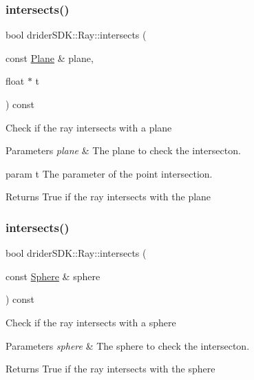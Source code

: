 \subsubsection{\texorpdfstring{intersects()}{intersects()}\hspace{0.1cm}{\footnotesize\ttfamily [3/6]}}
{\footnotesize\ttfamily bool drider\+S\+D\+K\+::\+Ray\+::intersects (\begin{DoxyParamCaption}\item[{const \hyperlink{classdrider_s_d_k_1_1_plane}{Plane} \&}]{plane,  }\item[{float $\ast$}]{t }\end{DoxyParamCaption}) const}

Check if the ray intersects with a plane


\begin{DoxyParams}{Parameters}
{\em plane} & The plane to check the intersecton.\\
\hline
\end{DoxyParams}
param t The parameter of the point intersection.

\begin{DoxyReturn}{Returns}
True if the ray intersects with the plane 
\end{DoxyReturn}
\mbox{\label{classdrider_s_d_k_1_1_ray_a05055967612158c946b36e965b0d817a}} 
\subsubsection{\texorpdfstring{intersects()}{intersects()}\hspace{0.1cm}{\footnotesize\ttfamily [4/6]}}
{\footnotesize\ttfamily bool drider\+S\+D\+K\+::\+Ray\+::intersects (\begin{DoxyParamCaption}\item[{const \hyperlink{classdrider_s_d_k_1_1_sphere}{Sphere} \&}]{sphere }\end{DoxyParamCaption}) const}

Check if the ray intersects with a sphere


\begin{DoxyParams}{Parameters}
{\em sphere} & The sphere to check the intersecton.\\
\hline
\end{DoxyParams}
\begin{DoxyReturn}{Returns}
True if the ray intersects with the sphere 
\end{DoxyReturn}
\mbox{\label{classdrider_s_d_k_1_1_ray_a3575c298825f7130c067490f65bcd60e}} 
